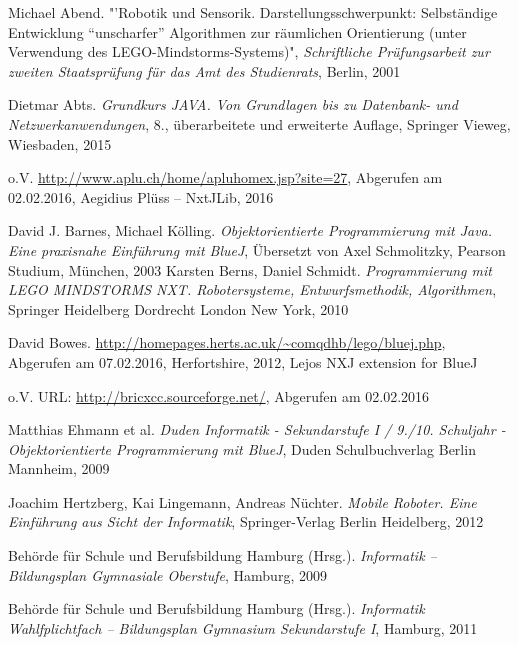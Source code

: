 \begin{thebibliography}{ABCDEF}

\renewcommand{\refname}{\normalsize Literaturverzeichnis}

Michael Abend. "'Robotik und Sensorik. Darstellungsschwerpunkt: Selbständige Entwicklung "`unscharfer"' Algorithmen zur räumlichen Orientierung (unter Verwendung des LEGO-Mindstorms-Systems)", \emph{Schriftliche Prüfungsarbeit zur zweiten Staatsprüfung für das Amt des Studienrats}, Berlin, 2001

Dietmar Abts. \emph{Grundkurs JAVA. Von Grundlagen bis zu Datenbank- und Netzwerkanwendungen}, 8., überarbeitete und erweiterte Auflage, Springer Vieweg, Wiesbaden, 2015

o.V. \url{http://www.aplu.ch/home/apluhomex.jsp?site=27}, Abgerufen am 02.02.2016, Aegidius Plüss -- NxtJLib, 2016

David J. Barnes, Michael Kölling. \emph{Objektorientierte Programmierung mit Java. Eine praxisnahe Einführung mit BlueJ}, Übersetzt von Axel Schmolitzky, Pearson Studium, München, 2003
\pagebreak
{}
Karsten Berns, Daniel Schmidt. \emph{Programmierung mit LEGO MINDSTORMS NXT. Robotersysteme, Entwurfsmethodik, Algorithmen}, Springer Heidelberg Dordrecht London New York, 2010

David Bowes. \url{http://homepages.herts.ac.uk/~comqdhb/lego/bluej.php}, Abgerufen am 07.02.2016, Herfortshire, 2012, Lejos NXJ extension for BlueJ

o.V. URL: \url{http://bricxcc.sourceforge.net/}, Abgerufen am 02.02.2016

Matthias Ehmann et al. \emph{Duden Informatik - Sekundarstufe I / 9./10. Schuljahr - Objektorientierte Programmierung mit BlueJ}, Duden Schulbuchverlag Berlin Mannheim, 2009

Joachim Hertzberg, Kai Lingemann, Andreas Nüchter. \emph{Mobile Roboter. Eine Einführung aus Sicht der Informatik}, Springer-Verlag Berlin Heidelberg, 2012

Behörde für Schule und Berufsbildung Hamburg (Hrsg.). \emph{Informatik -- Bildungsplan  Gymnasiale Oberstufe}, Hamburg, 2009

Behörde für Schule und Berufsbildung Hamburg (Hrsg.). \emph{Informatik Wahlfplichtfach -- Bildungsplan Gymnasium Sekundarstufe I}, Hamburg, 2011


\end{thebibliography}
